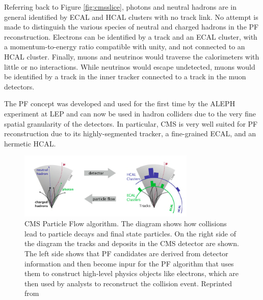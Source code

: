 Referring back to Figure \ref{fig:cmsslice}, photons and neutral hadrons are in general identified by ECAL and HCAL clusters with no track link. No attempt is made to distinguish the various species of neutral and charged hadrons in the PF reconstruction. Electrons can be identified by a track and an ECAL cluster, with a momentum-to-energy ratio compatible with unity, and not connected to an HCAL cluster. Finally, muons and neutrinos would traverse the calorimeters with little or no interactions. While neutrinos would escape undetected, muons would be identified by a track in the inner tracker connected to a track in the muon detectors.

The PF concept was developed and used for the first time by the ALEPH experiment at LEP\cite{BUSKULIC1995481} and can now be used in hadron colliders due to the very fine spatial granularity of the detectors. In particular, CMS is very well suited for PF reconstruction due to its highly-segmented tracker,  a fine-grained ECAL, and an hermetic HCAL.


 \begin{figure}[h]
  	\label{fig:pf}
 	\centering
 	\includegraphics[width=0.75\textwidth]{figures/jets.png}
 	\singlespace
 	\caption{CMS Particle Flow algorithm. The diagram shows how collisions lead to particle decays and final state particles. On the right side of the diagram the tracks and deposits in the CMS detector are shown. The left side shows that PF candidates are derived from detector information and then become inpur for the PF algorithm that uses them to construct high-level physics objects like electrons, which are then used by analysts to reconstruct the collision event. Reprinted from \cite{CMS-PAS-PFT-09-001}}
 \end{figure}

